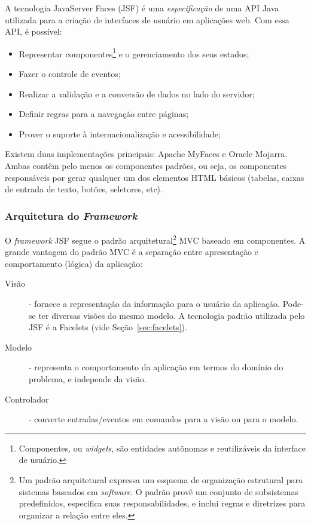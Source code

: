 \documentclass[
  10.5pt,				  %
	openright,			%
	twoside,			  %
  a5paper,
  chapter=TITLE,	%
	section=TITLE,	%
  hyphens,        %
	english,        %
	brazil          %
]{abntex2}
\begin{document}
A tecnologia JavaServer Faces (JSF) é uma \emph{especificação} de uma API Java utilizada para a criação de interfaces de usuário em aplicações web. Com essa API, é possível:
%
\begin{itemize}
  \item Representar componentes\footnote{Componentes, ou \emph{widgets}, são entidades autônomas e reutilizáveis da interface de usuário.} e o gerenciamento dos seus estados;
  \item Fazer o controle de eventos;
  \item Realizar a validação e a conversão de dados no lado do servidor;
  \item Definir regras para a navegação entre páginas;
  \item Prover o suporte à internacionalização e acessibilidade;
\end{itemize}
%

Existem duas implementações principais: Apache MyFaces e Oracle Mojarra. Ambas contêm pelo menos os componentes padrões, ou seja, os componentes responsáveis por gerar qualquer um dos elementos HTML básicos (tabelas, caixas de entrada de texto, botões, seletores, etc). 


\subsubsection{Arquitetura do \emph{Framework}}

O \emph{framework} JSF segue o padrão arquitetural\footnote{Um padrão arquitetural expressa um esquema de organização estrutural para sistemas baseados em \emph{software}. O padrão provê um conjunto de subsistemas predefinidos, especifica suas responsabilidades, e inclui regras e diretrizes para organizar a relação entre eles.\cite{buschmann96}} MVC baseado em componentes. A grande vantagem do padrão MVC é a separação entre apresentação e comportamento (lógica) da aplicação:

\begin{description}
  \item[Visão] - fornece a representação da informação para o usuário da aplicação. Pode-se ter diversas visões do mesmo modelo. A tecnologia padrão utilizada pelo JSF é a Facelets (vide Seção~\ref{sec:facelets}).
  \item[Modelo] - representa o comportamento da aplicação em termos do domínio do problema, e independe da visão.
  \item[Controlador] - converte entradas/eventos em comandos para a visão ou para o modelo.
\end{description}
\end{document}

